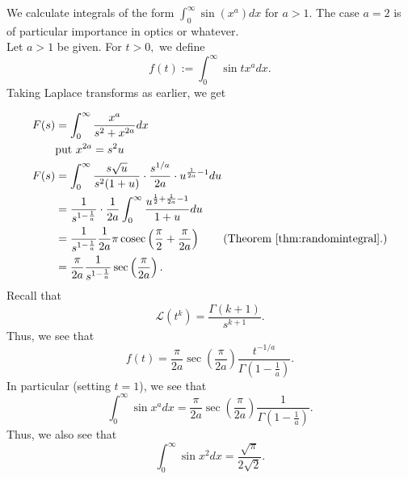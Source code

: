 \begin{mdframed}[style=boxstyle, frametitle={Generalised Fresnel integrals}]
	We calculate integrals of the form $\displaystyle\int_{0}^{\infty} \sin(x^a) dx$ for $a > 1.$ The case $a = 2$ is of particular importance in optics or whatever.\\
	Let $a > 1$ be given. For $t > 0,$ we define
	\begin{equation*} 
		f(t) := \int_{0}^{\infty} \sin tx^a dx.
	\end{equation*}
	Taking Laplace transforms as earlier, we get

	\begin{align*} 
		F(s) &= \int_{0}^{\infty} \dfrac{x^a}{s^2 + x^{2a}} dx\\
		&\text{put } x^{2a} = s^2 u\\
		F(s) &= \int_{0}^{\infty} \dfrac{s\sqrt{u}}{s^2(1 + u)}\cdot\dfrac{s^{1/a}}{2a}\cdot u^{\frac{1}{2a} - 1} du\\
		&= \dfrac{1}{s^{1 - \frac{1}{a}}}\cdot\dfrac{1}{2a}\int_{0}^{\infty} \dfrac{u^{\frac{1}{2} + \frac{1}{2a} - 1}}{1 + u} du\\
		&= \dfrac{1}{s^{1 - \frac{1}{a}}}\dfrac{1}{2a}\pi\operatorname{cosec}\left(\dfrac{\pi}{2} + \dfrac{\pi}{2a}\right) \qquad (\text{Theorem \ref{thm:randomintegral}.})\\
		&= \dfrac{\pi}{2a}\dfrac{1}{s^{1 - \frac{1}{a}}}\operatorname{sec}\left(\dfrac{\pi}{2a}\right).
	\end{align*}
	Recall that 
	\begin{equation*} 
		\mathcal{L}(t^k) = \dfrac{\Gamma(k+1)}{s^{k+1}}.
	\end{equation*}
	Thus, we see that
	\begin{equation*} 
		f(t) = \dfrac{\pi}{2a}\operatorname{sec}\left(\dfrac{\pi}{2a}\right)\dfrac{t^{-1/a}}{\Gamma\left(1 - \frac{1}{a}\right)}.
	\end{equation*}
	In particular (setting $t = 1$), we see that
	\begin{equation*} 
		\int_{0}^{\infty} \sin x^a dx = \dfrac{\pi}{2a}\operatorname{sec}\left(\dfrac{\pi}{2a}\right)\dfrac{1}{\Gamma\left(1 - \frac{1}{a}\right)}.
	\end{equation*}
	Thus, we also see that
	\begin{equation*} 
		\int_{0}^{\infty} \sin x^2 dx = \dfrac{\sqrt{\pi}}{2\sqrt{2}}.
	\end{equation*}
\end{mdframed}

